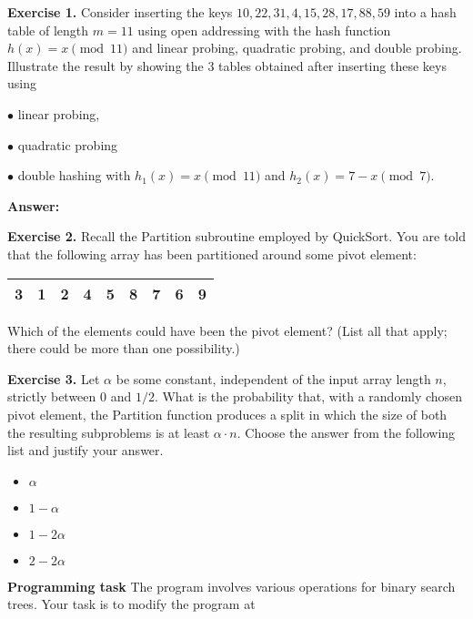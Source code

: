 \documentclass[11pt]{article}
\begin{document}
\textbf{Exercise 1.} Consider inserting the keys $10, 22, 31, 4, 15, 28, 17, 88, 59$ into a hash table of length $m=11$ using open addressing with the  hash function $h(x) = x \pmod{11}$ and linear probing, quadratic probing, and double probing. Illustrate  the result by showing the 3 tables obtained  after inserting these keys using 

$\bullet$ linear probing, 

$\bullet$ quadratic probing



$\bullet$ double hashing with $h_1(x) = x \pmod{11} $ and $h_2(x) = 7 - x \pmod{7}$.
  
\textbf{Answer:}
\bigskip




\textbf{Exercise 2.}  Recall the \textsf{Partition} subroutine employed by \textsf{QuickSort}. You are told that the following array has been partitioned around some pivot element:
\medskip

\begin{tabular}{|c|c|c|c|c|c|c|c|c|}
\hline 
3 & 1& 2 & 4 &5 &8 & 7 & 6 & 9 \\
\hline
\end{tabular}
\medskip

Which of the elements could have been the pivot element? (List all that apply; there could be more than one possibility.)
\medskip

\bigskip


\textbf{Exercise 3.}
Let $\alpha$ be some constant, independent of the input array length $n$, strictly between $0$ and $1/2$. What is the probability that, with a randomly chosen pivot element, the \textsf{Partition} function produces a split in which the size of both the resulting subproblems is at least $\alpha \cdot n$. Choose the answer from the following list and justify your answer.
\begin{itemize}
\item $\alpha$
\item $1 - \alpha$
\item $1-2\alpha$
\item $2 - 2 \alpha$
\end{itemize}
\medskip

\bigskip


\newpage



\textbf{Programming task} The program involves various operations for binary search trees. Your task is to modify the program  at
\end{document}
